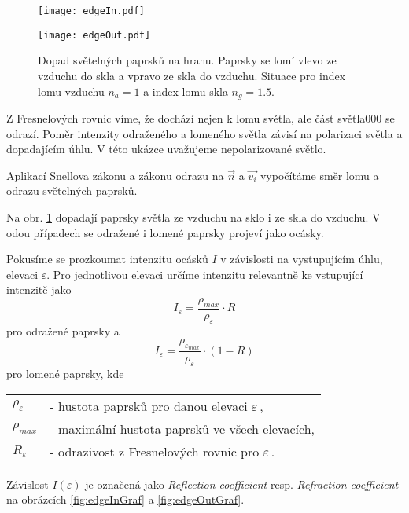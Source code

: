 \begin{figure}[htp]
\centering
\begin{minipage}[c]{0.48\textwidth}
\texttt{[image: edgeIn.pdf]}
\end{minipage}
\begin{minipage}[c]{0.48\textwidth}
\texttt{[image: edgeOut.pdf]}
\end{minipage}
\caption{Dopad světelných paprsků na hranu. Paprsky se lomí vlevo ze vzduchu do skla a vpravo ze skla do vzduchu. Situace pro index lomu vzduchu $n_a = 1$ a index lomu skla $n_g = 1.5$.}
\label{fig:edgeIn}
\end{figure}
Z Fresnelových rovnic víme, že dochází nejen k lomu světla, ale část světla000 se odrazí. Poměr intenzity odraženého a lomeného světla závisí na polarizaci světla a dopadajícím úhlu. V této ukázce uvažujeme nepolarizované světlo. 

Aplikací Snellova zákonu a zákonu odrazu na $\vec{n}$ a $\vec{v_i}$ vypočítáme směr lomu a odrazu světelných paprsků.

Na obr. \ref{fig:edgeIn} dopadají paprsky světla ze vzduchu na sklo i ze skla do vzduchu. V odou případech se odražené i lomené paprsky projeví jako ocásky.

Pokusíme se prozkoumat intenzitu ocásků $I$ v závislosti na vystupujícím úhlu, elevaci $\varepsilon$. 
Pro jednotlivou elevaci určíme intenzitu relevantně ke vstupující intenzitě jako 
\begin{equation}
 I_\varepsilon  = \frac{\rho_{{max}}}{\rho_\varepsilon}\cdot R
\end{equation}
pro odražené paprsky a 
\begin{equation}
 I_\varepsilon  = \frac{\rho_{\varepsilon_{max}}}{\rho_\varepsilon}\cdot (1-R)
\end{equation}
pro lomené paprsky, kde  

	\begin{tabular}{l l}
	$\rho_{\varepsilon}$ & 	- hustota paprsků pro danou elevaci $\varepsilon\,$,\\
	$\rho_{{max}}$  	&	- maximální hustota paprsků ve všech elevacích,\\
	$R_\varepsilon$		&	- odrazivost z Fresnelových rovnic pro $\varepsilon\,$.	 \\
	
	\end{tabular}

Závislost $I(\varepsilon)$ je označená jako \textit{Reflection coefficient} resp. \textit{Refraction coefficient} na obrázcích \ref{fig:edgeInGraf} a \ref{fig:edgeOutGraf}.


